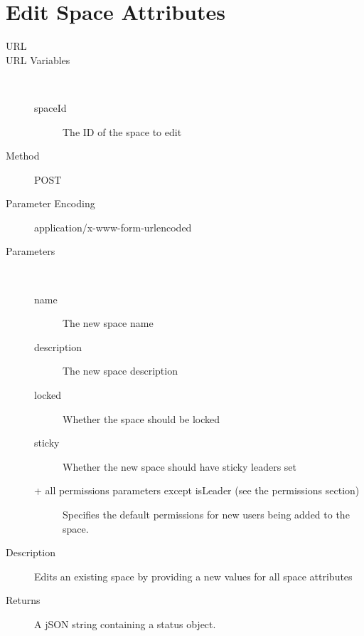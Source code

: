 \section{Edit Space Attributes}
\begin{description}
\item [URL] 
\item [URL Variables] \
	\begin{description}
	\item [spaceId]  The ID of the space to edit
	\end{description}
\item [Method] POST
\item [Parameter Encoding] application/x-www-form-urlencoded
\item [Parameters] \
	\begin{description}
	\item [name]  The new space name
	\item [description]  The new space description
	\item [locked]  Whether the space should be locked
	\item [sticky] \type{Boolean} Whether the new space should have sticky leaders set
	\item [+ all permissions parameters except isLeader (see the permissions section)] Specifies the default permissions for new users being added to the space.
	\end{description}
\item [Description] Edits an existing space by providing a new values for all space attributes
\item [Returns] A jSON string containing a status object.
\end{description}

